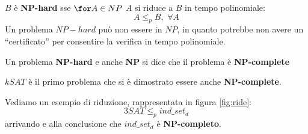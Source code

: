\documentclass[a4paper,12pt, oneside]{book}
\begin{document}
\begin{definizione}
  $B$ è \textbf{NP-hard} sse $\for A\in NP$ $A$ si riduce a $B$ in tempo
  polinomiale:
  \[A\leq_p B,\,\,\forall A\]
  Un problema $NP-hard$ può non essere in $NP$, in quanto potrebbe non avere un
  ``certificato'' per consentire la verifica in tempo polinomiale.
\end{definizione}
\begin{definizione}
  Un problema \textbf{NP-hard} e anche \textbf{NP} si dice che il problema è
  \textbf{NP-complete} 
\end{definizione}
$kSAT$ è il primo problema che si è dimostrato essere anche
\textbf{NP-complete}.
\begin{esempio}
  Vediamo un esempio di riduzione, rappresentata in figura \ref{fig:ride}:
  \[3SAT\leq_p ind\_set_d\]
  arrivando e alla conclusione che $ind\_set_d$ è \textbf{NP-completo}.\\
  \begin{figure}
    \centering
    

\end{figure}
\end{esempio}
\end{document}
